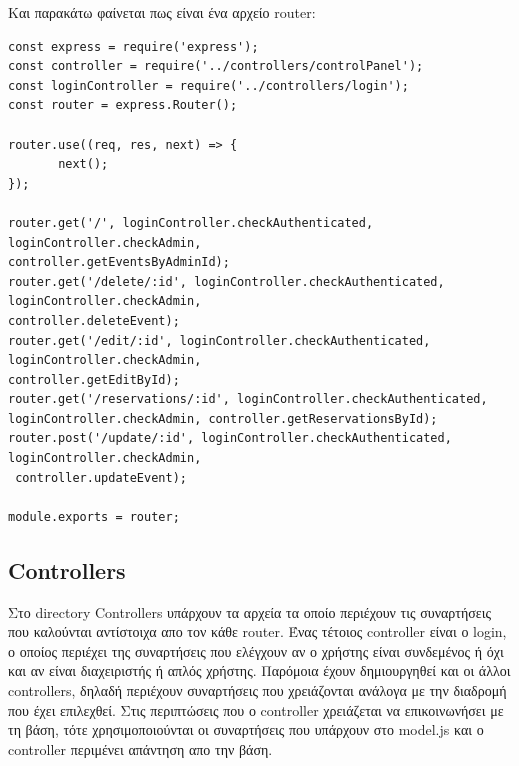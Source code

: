 \documentclass{acmart}
\begin{document}
Και παρακάτω φαίνεται πως είναι ένα αρχείο router:
\begin{lstlisting}
const express = require('express');
const controller = require('../controllers/controlPanel');
const loginController = require('../controllers/login');
const router = express.Router();

router.use((req, res, next) => {
       next();
});

router.get('/', loginController.checkAuthenticated, loginController.checkAdmin, 
controller.getEventsByAdminId);
router.get('/delete/:id', loginController.checkAuthenticated, loginController.checkAdmin, 
controller.deleteEvent);
router.get('/edit/:id', loginController.checkAuthenticated, loginController.checkAdmin, 
controller.getEditById);
router.get('/reservations/:id', loginController.checkAuthenticated, 
loginController.checkAdmin, controller.getReservationsById);
router.post('/update/:id', loginController.checkAuthenticated, loginController.checkAdmin, 
 controller.updateEvent);

module.exports = router;
\end{lstlisting}

\subsection*{Controllers}
Στο directory Controllers υπάρχουν τα αρχεία τα οποίο περιέχουν τις συναρτήσεις που καλούνται αντίστοιχα απο τον κάθε
router. Ένας τέτοιος controller είναι ο login, ο οποίος περιέχει της συναρτήσεις που ελέγχουν αν ο χρήστης είναι 
συνδεμένος ή όχι και αν είναι διαχειριστής ή απλός χρήστης. Παρόμοια έχουν δημιουργηθεί και οι άλλοι controllers, δηλαδή
περιέχουν συναρτήσεις που χρειάζονται ανάλογα με την διαδρομή που έχει επιλεχθεί.
Στις περιπτώσεις που ο controller χρειάζεται να επικοινωνήσει με τη βάση, τότε χρησιμοποιούνται οι συναρτήσεις που υπάρχουν 
στο model.js και ο controller περιμένει απάντηση απο την βάση.
\end{document}
